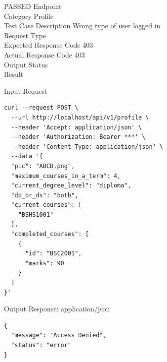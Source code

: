 \begin{testcase}{7}{PASSED}
Endpoint \hfill {}\\
Category \hfill Profile\\
Test Case Description \hfill Wrong type of user logged in\\

Request Type    \hfill {}\\
Expected Response Code    \hfill 403\\
Actual Response Code    \hfill 403\\

Output Status \hfill {}\\
Result \hfill {}

\begin{ipblock}{Input Request}
\begin{verbatim}
curl --request POST \
  --url http://localhost/api/v1/profile \
  --header 'Accept: application/json' \
  --header 'Authorization: Bearer ***' \
  --header 'Content-Type: application/json' \
  --data '{
  "pic": "ABCD.png",
  "maximum_courses_in_a_term": 4,
  "current_degree_level": "diploma",
  "dp_or_ds": "both",
  "current_courses": [
    "BSHS1001"
  ],
  "completed_courses": [
    {
      "id": "BSC2001",
      "marks": 90
    }
  ]
}'
\end{verbatim}
\end{ipblock}

\begin{opblock}{Output Response: application/json}
\begin{verbatim}
{
  "message": "Access Denied",
  "status": "error"
}
\end{verbatim}
\end{opblock}
\end{testcase}


